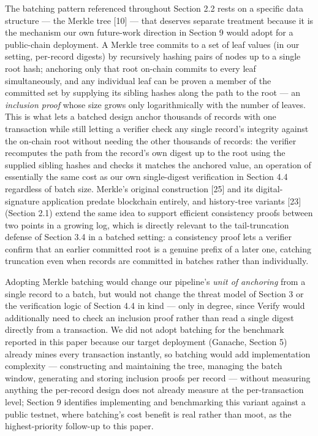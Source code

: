 \documentclass[journal]{IEEEtran}
\begin{document}
The batching pattern referenced throughout Section 2.2 rests on a specific data structure --- the Merkle tree [10] --- that deserves separate treatment because it is the mechanism our own future-work direction in Section 9 would adopt for a public-chain deployment. A Merkle tree commits to a set of leaf values (in our setting, per-record digests) by recursively hashing pairs of nodes up to a single root hash; anchoring only that root on-chain commits to every leaf simultaneously, and any individual leaf can be proven a member of the committed set by supplying its sibling hashes along the path to the root --- an \emph{inclusion proof} whose size grows only logarithmically with the number of leaves. This is what lets a batched design anchor thousands of records with one transaction while still letting a verifier check any single record's integrity against the on-chain root without needing the other thousands of records: the verifier recomputes the path from the record's own digest up to the root using the supplied sibling hashes and checks it matches the anchored value, an operation of essentially the same cost as our own single-digest verification in Section 4.4 regardless of batch size. Merkle's original construction [25] and its digital-signature application predate blockchain entirely, and history-tree variants [23] (Section 2.1) extend the same idea to support efficient consistency proofs between two points in a growing log, which is directly relevant to the tail-truncation defense of Section 3.4 in a batched setting: a consistency proof lets a verifier confirm that an earlier committed root is a genuine prefix of a later one, catching truncation even when records are committed in batches rather than individually.

Adopting Merkle batching would change our pipeline's \emph{unit of anchoring} from a single record to a batch, but would not change the threat model of Section 3 or the verification logic of Section 4.4 in kind --- only in degree, since Verify would additionally need to check an inclusion proof rather than read a single digest directly from a transaction. We did not adopt batching for the benchmark reported in this paper because our target deployment (Ganache, Section 5) already mines every transaction instantly, so batching would add implementation complexity --- constructing and maintaining the tree, managing the batch window, generating and storing inclusion proofs per record --- without measuring anything the per-record design does not already measure at the per-transaction level; Section 9 identifies implementing and benchmarking this variant against a public testnet, where batching's cost benefit is real rather than moot, as the highest-priority follow-up to this paper.
\end{document}

